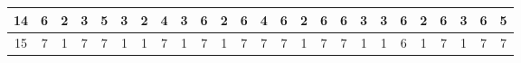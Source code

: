 \begin{sidewaystable}[]
\begin{tabular}{|c|c|c|c|c|c|c|c|c|c|c|c|c|c|c|c|c|c|c|c|c|c|c|c|c|}
    14      & 6                                               & 2                                               & 3                                               & 5                                               & 3                                               & 2                                               & 4                                               & 3                                               & 6                                               & 2                                                & 6                                                & 4                                                & 6                                               & 2                                               & 6                                               & 6                                               & 3                                               & 3                                               & 6                                               & 2                                                 & 6                                               & 3                                                & 6                                                & 5                                                \\ \hline
    15      & 7                                               & 1                                               & 7                                               & 7                                               & 1                                               & 1                                               & 7                                               & 1                                               & 7                                               & 1                                                & 7                                                & 7                                                & 7                                               & 1                                               & 7                                               & 7                                               & 1                                               & 1                                               & 6                                               & 1                                                 & 7                                               & 1                                                & 7                                                & 7                                                \\ \hline

\end{tabular}
\end{sidewaystable}
